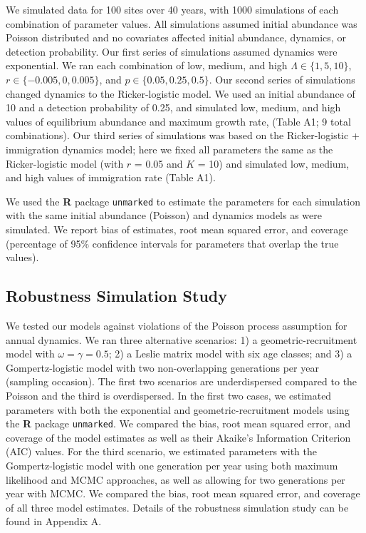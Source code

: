 \documentclass[12pt,english]{article}
\begin{document}
\begin{spacing}{1.9}
\begin{flushleft}
We simulated data for 100 sites over 40 years, with 1000 simulations of 
each combination of parameter values.  All
simulations assumed initial abundance was Poisson distributed
and no covariates affected initial abundance, dynamics, or
detection probability.  Our first series of simulations
assumed dynamics were exponential.  We ran 
each combination of low, medium, and high $\Lambda \in
\{1,5,10\}$, $r \in \{-0.005, 0, 0.005\}$, and
$p \in \{0.05, 0.25, 0.5\}$. 
Our second series of simulations changed dynamics to the Ricker-logistic
model. We used an initial abundance of 10 and a detection probability
of 0.25, and simulated low, medium, and high values of equilibrium
abundance and maximum growth rate, (Table A1;
9 total combinations). Our third series of simulations was based
on the Ricker-logistic + immigration dynamics model; here we fixed all
parameters the same as the Ricker-logistic model (with $r$ = 0.05 and $K$ = 10) and
simulated low, medium, and high values of immigration rate (Table A1).

We used the \textbf{R} package \texttt{unmarked} to estimate the parameters 
for each simulation with the same
initial abundance (Poisson) and dynamics models as were simulated.
We report bias of estimates, root
mean squared error, and coverage (percentage of 95\% confidence
intervals for parameters that overlap the true values).

\subsection*{Robustness Simulation Study}

We tested our models against violations of the Poisson process assumption for
annual dynamics.  We ran three alternative scenarios: 1) a geometric-recruitment model with
$\omega = \gamma = 0.5$; 2) a Leslie matrix model with six age classes; and 3) 
a Gompertz-logistic model with two non-overlapping generations per year (sampling occasion).   
The first two scenarios are underdispersed compared to the Poisson and the third is overdispersed.
In the first two cases, we estimated parameters with both the exponential and geometric-recruitment
models using the \textbf{R} package \texttt{unmarked}.  We compared the bias,
root mean squared error, and coverage of the model estimates as well as their Akaike's Information
Criterion (AIC) values.
For the third scenario, we estimated parameters with the Gompertz-logistic model with 
one generation per year using both maximum likelihood and MCMC approaches, as well
as allowing for two generations per year with MCMC.  We compared the bias, root mean
squared error, and coverage of all three model estimates.  Details of the robustness simulation
study can be found in Appendix A.


\end{flushleft}
\end{spacing}
\end{document}
